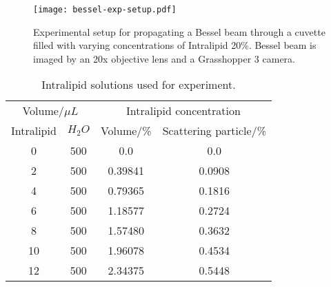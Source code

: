 \begin{figure}[ht!]
    \centering
    \texttt{[image: bessel-exp-setup.pdf]}
    \caption{Experimental setup for propagating a Bessel beam through a cuvette filled with varying concentrations of Intralipid 20\%. Bessel beam is imaged by an 20x objective lens and a Grasshopper 3 camera.}
    \label{fig:expsetup}
\end{figure}

\begin{table}[!ht]
\centering
    \begin{tabular}{cc|cc}
        \hline
        \multicolumn{2}{c|}{Volume/$\mu L$} & \multicolumn{2}{|c}{Intralipid concentration}                       \\
        Intralipid                & $H_2O$  & Volume/\%      & Scattering particle/\% \\ \hline
        \multicolumn{1}{c|}{0}    & 500     & \multicolumn{1}{c|}{0.0}       & 0.0                                    \\
        \multicolumn{1}{c|}{2}    & 500     & \multicolumn{1}{c|}{0.39841} & 0.0908                                \\
        \multicolumn{1}{c|}{4}    & 500     & \multicolumn{1}{c|}{0.79365} & 0.1816                                \\
        \multicolumn{1}{c|}{6}    & 500     & \multicolumn{1}{c|}{1.18577} & 0.2724                                \\
        \multicolumn{1}{c|}{8}    & 500     & \multicolumn{1}{c|}{1.57480} & 0.3632                                \\
        \multicolumn{1}{c|}{10}   & 500     & \multicolumn{1}{c|}{1.96078} & 0.4534                                \\
        \multicolumn{1}{c|}{12}   & 500     & \multicolumn{1}{c|}{2.34375} & 0.5448                                \\ \hline
    \end{tabular}
    \caption{Intralipid solutions used for experiment.}
    \label{tab:intra}
\end{table}


